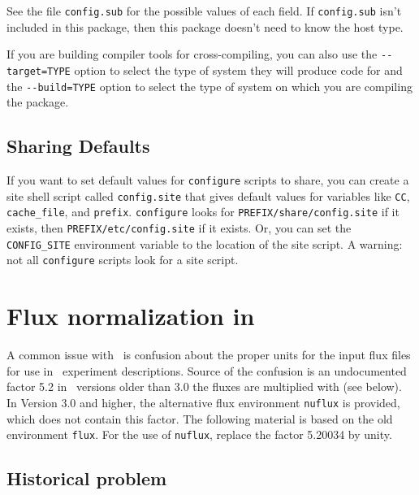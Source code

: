 \begin{appendix}
See the file \verb+config.sub+ for the possible values of each field.  If
\verb+config.sub+ isn't included in this package, then this package doesn't
need to know the host type.

   If you are building compiler tools for cross-compiling, you can also
use the \verb+--target=TYPE+ option to select the type of system they will
produce code for and the \verb+--build=TYPE+ option to select the type of
system on which you are compiling the package.

\section*{Sharing Defaults}

   If you want to set default values for \verb+configure+ scripts to share,
you can create a site shell script called \verb+config.site+ that gives
default values for variables like \verb+CC+, \verb+cache_file+, and \verb+prefix+.
\verb+configure+ looks for \verb+PREFIX/share/config.site+ if it exists, then
\verb+PREFIX/etc/config.site+ if it exists.  Or, you can set the
\verb+CONFIG_SITE+ environment variable to the location of the site script.
A warning: not all \verb+configure+ scripts look for a site script.






\chapter{Flux normalization in \GLOBES }
\label{app:flux}

A common issue with \GLOBES\ is confusion about the proper units for
the input flux files for use in \AEDL\ experiment descriptions. Source of
the confusion is an undocumented factor 5.2 in \GLOBES\ versions older
than 3.0 the fluxes are multiplied with (see below). In Version 3.0 and 
higher, the alternative flux environment {\tt nuflux} is provided, 
which does not contain this factor. The following material is
based on the old environment {\tt flux}. For the use of {\tt nuflux},
replace the factor 5.20034 by unity.

\section*{Historical problem}


\end{appendix}
